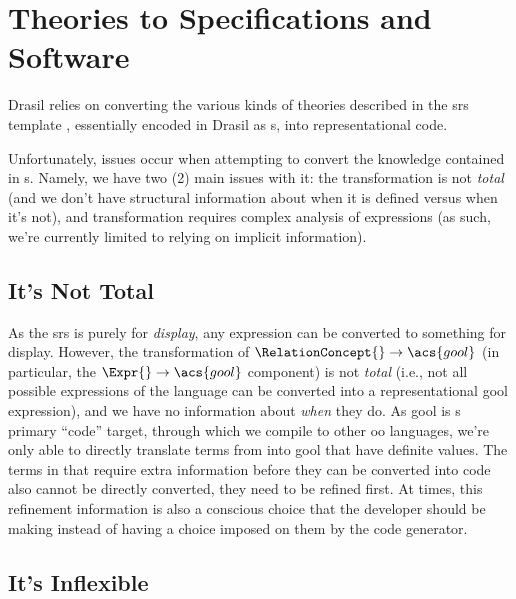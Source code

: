 \section{Theories to Specifications and Software}

Drasil relies on converting the various kinds of theories described in the
\acs{srs} template \cite{SmithAndLai2005}, essentially encoded in Drasil as
\RelationConcept{}s, into representational code.


Unfortunately, issues occur when attempting to convert the knowledge contained
in \RelationConcept{}s. Namely, we have two (2) main issues with it: the
transformation is not \textit{total} (and we don't have structural information
about when it is defined versus when it's not), and transformation requires
complex analysis of expressions (as such, we're currently limited to relying on
implicit information).

\subsection{It's Not Total}

As the \acs{srs} is purely for \textit{display}, any \Expr{} expression can be
converted to something for display. However, the transformation of
\(\RelationConcept{} \rightarrow \acs{gool}\) (in particular, the \(\Expr{}
\rightarrow \acs{gool}\) component) is not \textit{total} (i.e., not all
possible expressions of the \Expr{} language can be converted into a
representational \acs{gool} expression), and we have no information about
\textit{when} they do. As \acs{gool} is \Expr{}s primary ``code'' target,
through which we compile to other \acs{oo} languages, we're only able to
directly translate terms from \Expr{} into \acs{gool} that have definite values.
The terms in \Expr{} that require extra information before they can be converted
into code also cannot be directly converted, they need to be refined first. At
times, this refinement information is also a conscious choice that the developer
should be making instead of having a choice imposed on them by the code
generator.

\subsection{It's Inflexible}


